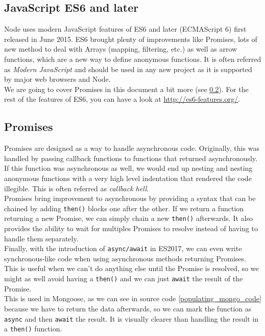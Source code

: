 \documentclass[twoside, openright,11pt,a4paper]{book}
\begin{document}
\subsection{JavaScript ES6 and later}
Node uses modern JavaScript features of ES6 and later\cite{wiki:ecmascript} (ECMAScript 6) first released in June 2015. ES6 brought plenty of improvements like Promises, lots of new method to deal with Arrays (mapping, filtering, etc.) as well as arrow functions, which are a new way to define anonymous functions. It is often referred as \emph{Modern JavaScript} and should be used in any new project as it is supported by major web browsers and Node. \\

We are going to cover Promises in this document a bit more (see \ref{promises}). For the rest of the features of ES6, you can have a look at \url{http://es6-features.org/}.
\subsection{Promises}
\label{promises}
Promises\cite{mdn:doc:promises} are designed as a way to handle asynchronous code. Originally, this was handled by passing callback functions to functions that returned asynchronously. If this function was asynchronous as well, we would end up nesting and nesting anonymous functions with a very high level indentation that rendered the code illegible. This is often referred as \emph{callback hell}. \\

Promises bring improvement to asynchronous by providing a syntax that can be chained by adding \verb+then()+ blocks one after the other. If we return a function returning a new Promise, we can simply chain a new \verb+then()+ afterwards. It also provides the ability to wait for multiples Promises to resolve instead of having to handle them separately. \\

Finally, with the introduction of \verb+async/await+\cite{google:dev:async_await} in ES2017, we can even write synchronous-like code when using asynchronous methods returning Promises. This is useful when we can't do anything else until the Promise is resolved, so we might as well avoid having a \verb+then()+ and we can just \verb+await+ the result of the Promise. \\

This is used in Mongoose, as we can see in source code \ref{populating_mongo_code} because we have to return the data afterwards, so we can mark the function as \verb+async+ and then \verb+await+ the result. It is visually clearer than handling the result in a \verb+then()+ function.
\end{document}
